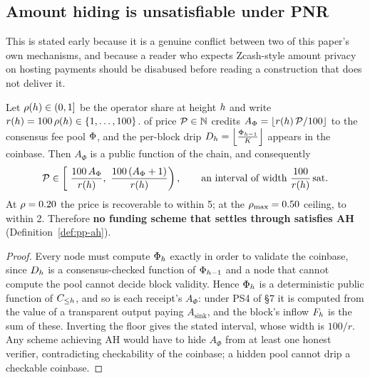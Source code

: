 \subsection{Amount hiding is unsatisfiable under PNR}\label{sec:pp-amounthiding}
\label{sec:pp-amount}

This is stated early because it is a genuine conflict between two of this paper's own mechanisms, and
because a reader who expects Zcash-style amount privacy on hosting payments should be disabused before
reading a construction that does not deliver it.

\begin{property}
\label{prop:pp-amount}
Let $\rho(h) \in (0,1]$ be the operator share at height $h$ and write
$r(h) = 100\,\rho(h) \in \{1,\dots,100\}$. 
of price $\mathcal{P} \in \mathbb{N}$ \sat{} credits
$A_\Phi = \left\lfloor r(h)\,\mathcal{P} / 100 \right\rfloor$ \sat{} to the consensus fee pool $\Phi$,
and the per-block drip $D_{h} = \left\lfloor \frac{\Phi_{h-1}}{K} \right\rfloor$ appears in the coinbase. Then
$A_\Phi$ is a public function of the chain, and consequently
\[
  \price \in \left[\ \frac{100\,A_\Phi}{r(\hgt)},\ \frac{100\,(A_\Phi+1)}{r(\hgt)} \right),
  \qquad \text{an interval of width } \frac{100}{r(\hgt)} \sat.
\]
At $\rho = 0.20$ the price is recoverable to within \num{5}\sat; at the $\rho_{\max} = 0.50$
ceiling, to within \num{2}\sat. Therefore \textbf{no funding scheme that settles through \PNR{}
satisfies AH} (Definition~\ref{def:pp-ah}).
\end{property}

\begin{proof}
Every node must compute $\Phi_{h}$ exactly in order to validate the coinbase, since $D_{h}$ is a
consensus-checked function of $\Phi_{h-1}$ and a node that cannot compute the pool cannot decide
block validity. Hence $\Phi_{h}$ is a deterministic public function of $C_{\le h}$, and so is each receipt's
$A_\Phi$: under PS4 of \S7 it is computed from the value of a transparent output paying
$A_{\mathrm{sink}}$, and the block's inflow $F_{h}$ is the sum of these. Inverting the floor gives the stated
interval, whose width is $100/r$. Any scheme achieving AH would have to hide $A_\Phi$ from at least
one honest verifier, contradicting checkability of the coinbase; a hidden pool cannot drip a checkable
coinbase.
\end{proof}

